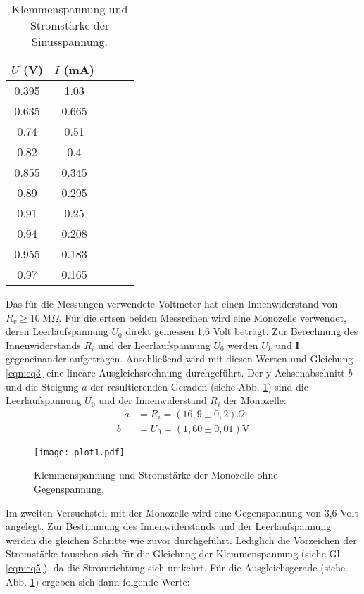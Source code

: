 \begin{table}
  \centering
  \caption{Klemmenspannung und Stromstärke der Sinusspannung.}
  \label{tab:daten_plot4}
  \begin{tabular}{c c c c c}
    \toprule
    $U$ (V) & $I$ (mA) \\
    \midrule
    0.395 &  1.03 \\
    0.635 & 0.665 \\
     0.74 &  0.51 \\
     0.82 &   0.4 \\
    0.855 & 0.345 \\
     0.89 & 0.295 \\
     0.91 &  0.25 \\
     0.94 & 0.208 \\
    0.955 & 0.183 \\
     0.97 & 0.165 \\
    \bottomrule
  \end{tabular}
\end{table}
\FloatBarrier
\noindent
Das für die Messungen verwendete Voltmeter hat einen Innenwiderstand von $R_v \geq \SI{10}{\mega\Omega}$.
Für die ertsen beiden Messreihen wird eine Monozelle verwendet, deren Leerlaufspannung $U_0$ direkt gemessen 1,6 Volt beträgt.
Zur Berechnung des Innenwiderstands $R_i$ und der Leerlaufspannung $U_0$ werden $U_k$ und $\symbf{I}$ gegeneinander aufgetragen.
Anschließend wird mit diesen Werten und Gleichung \eqref{eqn:eq3} eine lineare Ausgleichsrechnung durchgeführt.
Der y-Achsenabschnitt $b$ und die Steigung $a$ der resultierenden Geraden (siehe Abb. \ref{fig:plot1}) sind die Leerlaufspannung $U_0$ und der Innenwiderstand $R_i$ der Monozelle:
\begin{align*}
  -a &= R_i = (16,9 \pm 0,2) \Omega \\
  b &= U_0 = (1,60 \pm 0,01) \text{V}
\end{align*}
\begin{figure}
  \centering
  \texttt{[image: plot1.pdf]}
  \caption{Klemmenspannung und Stromstärke der Monozelle ohne Gegenspannung.}
  \label{fig:plot1}
\end{figure}
Im zweiten Versuchsteil mit der Monozelle wird eine Gegenspannung von 3,6 Volt angelegt.
Zur Bestimmung des Innenwiderstands und der Leerlaufspannung werden die gleichen Schritte wie zuvor durchgeführt.
Lediglich die Vorzeichen der Stromstärke tauschen sich für die Gleichung der Klemmenspannung (siehe Gl. \eqref{eqn:eq5}), da die Stromrichtung sich umkehrt.
Für die Ausgleichsgerade (siehe Abb. \ref{fig:plot1}) ergeben sich dann folgende Werte:
